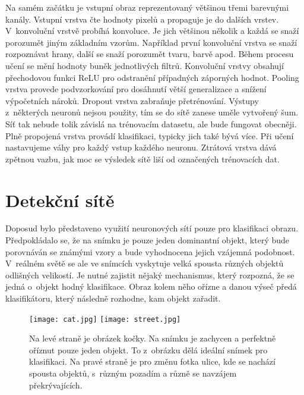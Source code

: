 Na samém začátku je vstupní obraz reprezentovaný většinou třemi barevnými kanály. Vstupní vrstva čte hodnoty pixelů a propaguje je do dalších vrstev. V~konvoluční vrstvě probíhá konvoluce. Je jich většinou několik a každá se snaží porozumět jiným základním vzorům. Například první konvoluční vrstva se snaží rozpoznávat hrany, další se snaží porozumět tvaru, barvě apod. Během procesu učení se mění hodnoty buněk jednotlivých filtrů. Konvoluční vrstvy obsahují přechodovou funkci ReLU pro odstranění případných záporných hodnot. Pooling vrstva provede podvzorkování pro dosáhnutí větší generalizace a snížení výpočetních nároků. Dropout vrstva zabraňuje přetrénování. Výstupy z~některých neuronů nejsou použity, tím se do sítě zanese uměle vytvořený šum. Síť tak nebude tolik závislá na trénovacím datasetu, ale bude fungovat obecněji. Plně propojená vrstva provádí klasifikaci, typicky jich také bývá více. Při učení nastavujeme váhy pro každý vstup každého neuronu. Ztrátová vrstva dává zpětnou vazbu, jak moc se výsledek sítě liší od označených trénovacích dat.


\section{Detekční sítě}
\label{sec_detection_networks}

Doposud bylo představeno využití neuronových sítí pouze pro klasifikaci obrazu. Předpokládalo se, že na snímku je pouze jeden dominantní objekt, který bude porovnáván se známými vzory a bude vyhodnocena jejich vzájemná podobnost. V~reálném světě se ale ve snímcích vyskytuje velká spousta různých objektů odlišných velikostí. Je nutné zajistit nějaký mechanismus, který rozpozná, že se jedná o~objekt hodný klasifikace. Obraz kolem něho ořízne a danou výseč předá klasifikátoru, který následně rozhodne, kam objekt zařadit.

\begin{figure}[H]
    \centering
    \texttt{[image: cat.jpg]}\hfill
    \texttt{[image: street.jpg]}
    \caption[Motivace k~algoritmům detekce objektů]{Na levé straně je obrázek kočky. Na snímku je zachycen a perfektně oříznut pouze jeden objekt. To z~obrázku dělá ideální snímek pro klasifikaci. Na pravé straně je pro změnu fotka ulice, kde se nachází spousta objektů, s~různým pozadím a různě se navzájem překrývajících.}
    \label{fig_cat_street}
\end{figure}

